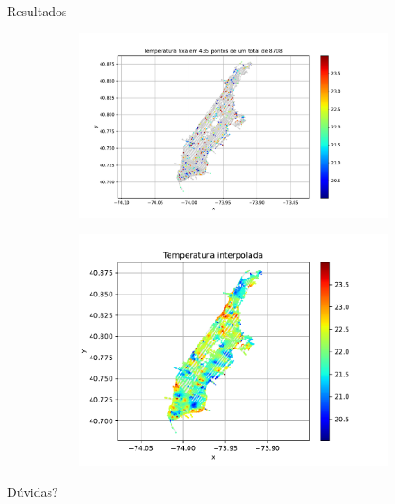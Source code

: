 \documentclass[11pt]{beamer}
\begin{document}
\begin{frame}{Resultados}
    \begin{figure}[htb]
        \hspace{-1cm}
        \begin{subfigure}{0.4\textwidth}
            \label{fig:fixos_435pontos}
            \centering
            \includegraphics[height=0.95\textwidth]{../figs/fig10.pdf}
        \end{subfigure}
        \hspace{1.9cm}
        \begin{subfigure}{0.4\textwidth}
            \label{fig:interpolado_435pontos}
            \centering
            \includegraphics[height=0.95\textwidth]{../figs/fig13.pdf}
        \end{subfigure}
    \end{figure}
\end{frame}

\begin{frame}
    \begin{center}
        Dúvidas?
    \end{center}
\end{frame}
\end{document}
